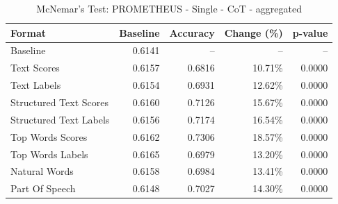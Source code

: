 \begin{table}[htbp]
\centering
\caption{McNemar's Test: PROMETHEUS - Single - CoT - aggregated}
\label{tab:prometheus-single-chain_of_thought_True-aggregated}
\begin{tabular}{lrrrr}
\toprule
Format & Baseline & Accuracy & Change (\%) & p-value \\
\midrule
Baseline & 0.6141 & -- & -- & -- \\
Text Scores & 0.6157 & 0.6816 & 10.71\% & 0.0000 \\
Text Labels & 0.6154 & 0.6931 & 12.62\% & 0.0000 \\
Structured Text Scores & 0.6160 & 0.7126 & 15.67\% & 0.0000 \\
Structured Text Labels & 0.6156 & 0.7174 & 16.54\% & 0.0000 \\
Top Words Scores & 0.6162 & 0.7306 & 18.57\% & 0.0000 \\
Top Words Labels & 0.6165 & 0.6979 & 13.20\% & 0.0000 \\
Natural Words & 0.6158 & 0.6984 & 13.41\% & 0.0000 \\
Part Of Speech & 0.6148 & 0.7027 & 14.30\% & 0.0000 \\
\bottomrule
\end{tabular}
\end{table}